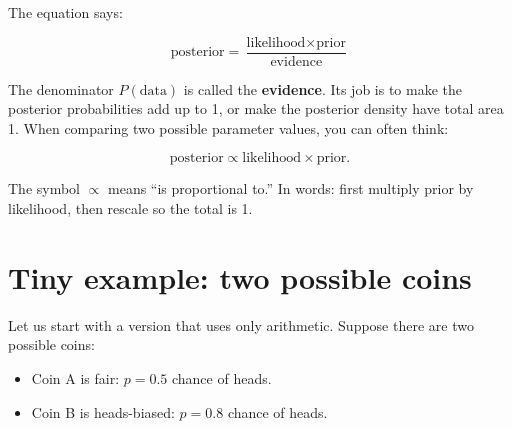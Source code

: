 \documentclass[11pt]{article}
\newcommand{\data}{\text{data}}
\newcommand{\prior}{\text{prior}}
\newcommand{\likelihood}{\text{likelihood}}
\newcommand{\posterior}{\text{posterior}}
\begin{document}
The equation says:

\begin{equation}
\boxed{\displaystyle
\posterior = \frac{\likelihood \times \prior}{\text{evidence}}
}
\end{equation}

The denominator $P(\data)$ is called the \textbf{evidence}. Its job is to make the posterior probabilities add up to 1, or make the posterior density have total area 1. When comparing two possible parameter values, you can often think:

\begin{equation}
\posterior \propto \likelihood \times \prior.
\end{equation}

The symbol $\propto$ means ``is proportional to.'' In words: first multiply prior by likelihood, then rescale so the total is 1.

\begin{center}
\end{center}

\section{Tiny example: two possible coins}

Let us start with a version that uses only arithmetic. Suppose there are two possible coins:

\begin{itemize}[leftmargin=1.5em]
  \item Coin A is fair: $p=0.5$ chance of heads.
  \item Coin B is heads-biased: $p=0.8$ chance of heads.
\end{itemize}
\end{document}
